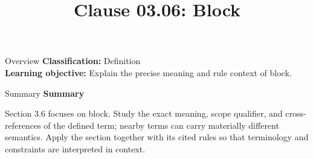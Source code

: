 \documentclass[10pt,letterpaper]{article}
\title{Clause 03.06: Block}
\author{}
\date{}
\begin{document}
\maketitle
\begin{CornellOverviewBox}{Overview}
\textbf{Classification:} Definition\\[2pt]
\textbf{Learning objective:} Explain the precise meaning and rule context of block.
\end{CornellOverviewBox}\begin{CornellSummaryBox}{Summary}
{\sffamily\bfseries\color{Accent} Summary}\par\vspace{3pt}Section 3.6 focuses on block. Study the exact meaning, scope qualifier, and cross-references of the defined term; nearby terms can carry materially different semantics. Apply the section together with its cited rules so that terminology and constraints are interpreted in context.
\end{CornellSummaryBox}
\end{document}

